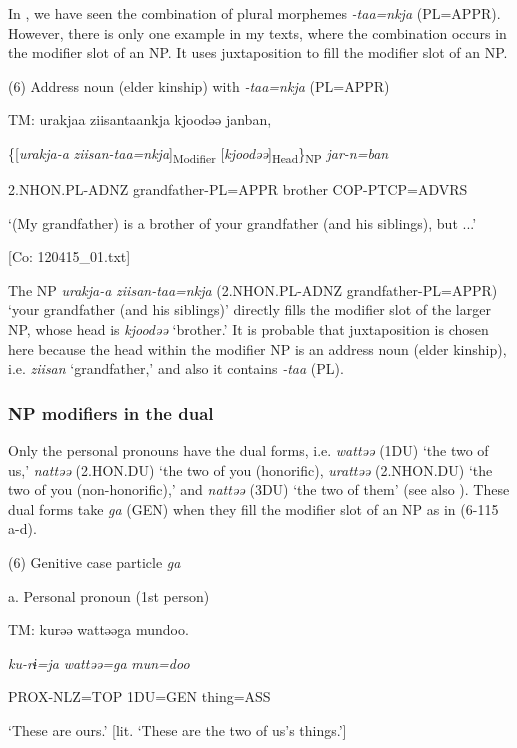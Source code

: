 In , we have seen the combination of plural morphemes \textit{{}-taa=nkja} (PL=APPR). However, there is only one example in my texts, where the combination occurs in the modifier slot of an NP. It uses juxtaposition to fill the modifier slot of an NP.

(6)  Address noun (elder kinship) with \textit{{}-taa=nkja} (PL=APPR)

  TM:  urakjaa  ziisantaankja  kjoodəə  janban,

    \{[\textit{urakja-a}  \textit{ziisan-taa=nkja}]\textsubscript{Modifier}  [\textit{kjoodəə}]\textsubscript{Head}\}\textsubscript{NP}  \textit{jar-n=ban}

    2.NHON.PL-ADNZ  grandfather{}-PL=APPR  brother  COP-PTCP=ADVRS

    ‘(My grandfather) is a brother of your grandfather (and his siblings), but ...’

    [Co: 120415\_01.txt]

The NP \textit{urakja-a} \textit{ziisan-taa=nkja} (2.NHON.PL-ADNZ grandfather-PL=APPR) ‘your grandfather (and his siblings)’ directly fills the modifier slot of the larger NP, whose head is \textit{kjoodəə} ‘brother.’ It is probable that juxtaposition is chosen here because the head within the modifier NP is an address noun (elder kinship), i.e. \textit{ziisan} ‘grandfather,’ and also it contains \textit{-taa} (PL).

\subsubsection{NP modifiers in the dual}

Only the personal pronouns have the dual forms, i.e. \textit{wattəə} (1DU) ‘the two of us,’ \textit{nattəə} (2.HON.DU) ‘the two of you (honorific), \textit{urattəə} (2.NHON.DU) ‘the two of you (non-honorific),’ and \textit{nattəə} (3DU) ‘the two of them’ (see also ). These dual forms take \textit{ga} (GEN) when they fill the modifier slot of an NP as in (6-115 a-d).

(6)  Genitive case particle \textit{ga}

  a.  Personal pronoun (1st person)

    TM:  kurəə  wattəəga  mundoo.

      \textit{ku-rɨ=ja}  \textit{wattəə=ga}  \textit{mun=doo}

      PROX-NLZ=TOP  1DU=GEN  thing=ASS

      ‘These are ours.’ [lit. ‘These are the two of us’s things.’]

